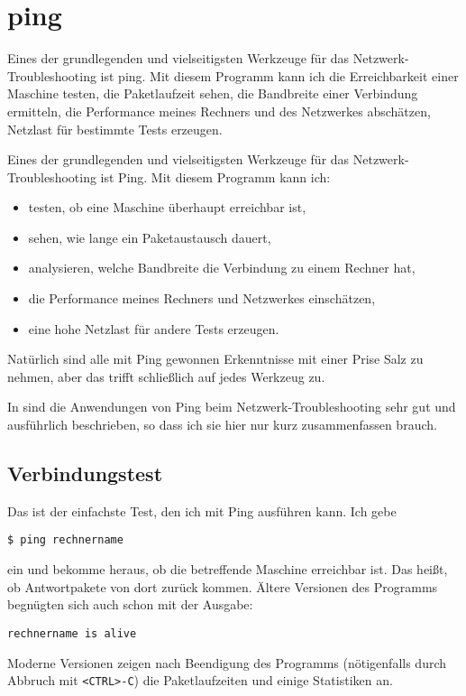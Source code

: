 \section{ping}
\label{sec:netz-werkzeuge-ping}
\begin{abstractsec}
  Eines der grundlegenden und vielseitigsten Werkzeuge für das
  Netzwerk-Troubleshooting ist ping. Mit diesem Programm kann ich die
  Erreichbarkeit einer Maschine testen, die Paketlaufzeit sehen, die
  Bandbreite einer Verbindung ermitteln, die Performance meines Rechners und
  des Netzwerkes abschätzen, Netzlast für bestimmte Tests erzeugen.
\end{abstractsec}
\begin{normaltext}
  Eines der grundlegenden und vielseitigsten Werkzeuge für das
  Netzwerk-Troubleshooting ist Ping. Mit diesem Programm kann ich:
  \begin{itemize}
    \item testen, ob eine Maschine überhaupt erreichbar ist,
    \item sehen, wie lange ein Paketaustausch dauert,
    \item analysieren, welche Bandbreite die Verbindung zu einem Rechner hat,
    \item die Performance meines Rechners und Netzwerkes einschätzen,
    \item eine hohe Netzlast für andere Tests erzeugen.
  \end{itemize}

  Natürlich sind alle mit Ping gewonnen Erkenntnisse mit einer Prise Salz zu
  nehmen, aber das trifft schließlich auf jedes Werkzeug zu.

  In \cite{sloan2001} sind die Anwendungen von Ping beim
  Netzwerk-Troubleshooting sehr gut und ausführlich beschrieben, so dass ich
  sie hier nur kurz zusammenfassen brauch.

  \subsection{Verbindungstest}
  Das ist der einfachste Test, den ich mit Ping ausführen kann. Ich gebe
  \begin{verbatim}
$ ping rechnername
  \end{verbatim}
  ein und bekomme heraus, ob die betreffende Maschine erreichbar ist. Das
  heißt, ob Antwortpakete von dort zurück kommen. Ältere Versionen des
  Programms begnügten sich auch schon mit der Ausgabe:\
  \begin{verbatim}
rechnername is alive
  \end{verbatim}
  Moderne Versionen zeigen nach Beendigung des Programms (nötigenfalls durch
  Abbruch mit \verb?<CTRL>-C?) die Paketlaufzeiten und einige Statistiken an.


\end{normaltext}
